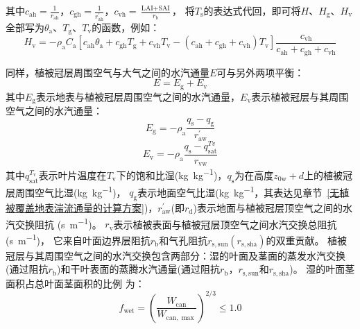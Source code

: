 其中$c_{\mathrm{ah}}=\frac{1}{r_{\mathrm{ah}}}$，$c_{\mathrm{gh}}=\frac{1}{r_{\mathrm{ah}}^\prime}$，$c_{\mathrm{vh}}=\frac{\text {LAI}+\text {SAI}}{r_{\mathrm {b}}}$，
将$T_{\mathrm {s}}$的表达式代回，即可将$H$、$H_{\mathrm{g}}$、$H_{\mathrm{v}}$全部写为$\theta_{\mathrm{a}}$、$T_{\mathrm {g}}$、$T_{\mathrm v}$的函数，例如：
\begin{equation}
  H_{\mathrm{v}}=-\rho_{\mathrm{a}} C_{\mathrm{a}}\left[c_{\mathrm{ah}} \theta_{\mathrm{a}}+c_{\mathrm{gh}}
    T_{\mathrm{g}}+c_{\mathrm{vh}} T_{\mathrm{v}}-\left(c_{\mathrm{ah}}+c_{\mathrm{gh}}+c_{\mathrm{vh}}\right)
  T_{\mathrm{v}}\right] \frac{c_{\mathrm{vh}}}{c_{\mathrm{ah}}+c_{\mathrm{gh}}+c_{\mathrm{vh}}}
\end{equation}


同样，植被冠层周围空气与大气之间的水汽通量$E$可与另外两项平衡：
\begin{equation}\label{EV_balance}
  E=E_{\mathrm{g}}+E_{\mathrm{v}}
\end{equation}
其中$E_{\mathrm{g}}$表示地表与植被冠层周围空气之间的水汽通量，$E_{\mathrm{v}}$表示植被冠层与其周围空气之间的水汽通量：
\begin{equation}\label{eq:Eg}
  E_{\mathrm{g}}=-\rho_{\mathrm{a}} \frac{q_{\mathrm{s}}-q_{\mathrm{g}}}{r_{\mathrm{a w}}^{\prime}}
\end{equation}
\begin{equation}
  E_{\mathrm{v}}=-\rho_{\mathrm{a}} \frac{q_{\mathrm{s}}-q_{\mathrm{s a t}}^{T v}}{r_{\mathrm{vw}}}
\end{equation}
其中$q_{\mathrm{sat}}^{T_{\mathrm v}}$表示叶片温度在$T_{\mathrm v}$下的饱和比湿(\unit{kg.kg^{-1}})，$q_{\mathrm {s}}$为在高度$z_{\mathrm{0w}}+d$上的植被冠层周围空气比湿(\unit{kg.kg^{-1}})，
$q_{\mathrm {g}}$表示地面空气比湿(\unit{kg.kg^{-1}}，其表达见章节~\ref{无植被覆盖地表湍流通量的计算方案})，$r_{\mathrm{aw}}^\prime$(即$r_{\mathrm {d}}$)表示地面与植被冠层顶空气之间的水汽交换阻抗 (\unit{s.m^{-1}})。
$r_{\mathrm{v}}$表示植被表面与植被冠层顶空气之间水汽交换总阻抗 (\unit{s.m^{-1}})，
它来自叶面边界层阻抗$r_{\mathrm {b}}$和气孔阻抗$r_{\mathrm{s,sun}}\left(r_{\mathrm{s,sha}}\right)$的双重贡献。
植被冠层与其周围空气之间的水汽交换包含两部分：湿的叶面及茎面的蒸发水汽交换(通过阻抗$r_{\mathrm {b}}$)和干叶表面的蒸腾水汽通量(通过阻抗$r_{\mathrm {b}}$，$r_{\mathrm{s,sun}}$和$r_{\mathrm{s,sha}}$)。
湿的叶面茎面积占总叶面茎面积的比例 \citep{dickinson1993biosphere} 为：
\begin{equation}\label{eq:fwet}
  f_{\mathrm{w e t}}=\left(\frac{W_{\mathrm{c a n}}}{W_{\mathrm{c a n, \max }}}\right)^{2 / 3} \leqslant 1.0
\end{equation}
